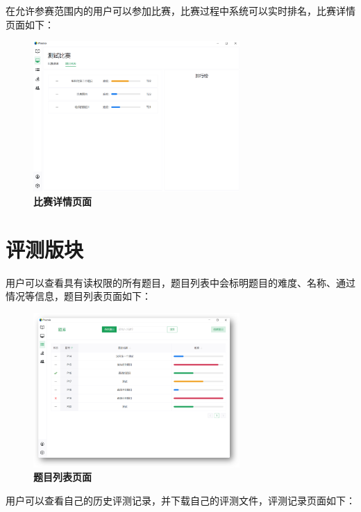 在允许参赛范围内的用户可以参加比赛，比赛过程中系统可以实时排名，比赛详情页面如下：

\begin{figure}[H]
    \centering
    \includegraphics[width=0.7\textwidth]{figure/contest2.png}
    \caption{\textbf{比赛详情页面}}
    \label{fig:contest2}
\end{figure}

\section{评测版块}

用户可以查看具有读权限的所有题目，题目列表中会标明题目的难度、名称、通过情况等信息，题目列表页面如下：

\begin{figure}[H]
    \centering
    \includegraphics[width=0.7\textwidth]{figure/problem1.png}
    \caption{\textbf{题目列表页面}}
    \label{fig:problem1}
\end{figure}

用户可以查看自己的历史评测记录，并下载自己的评测文件，评测记录页面如下：

